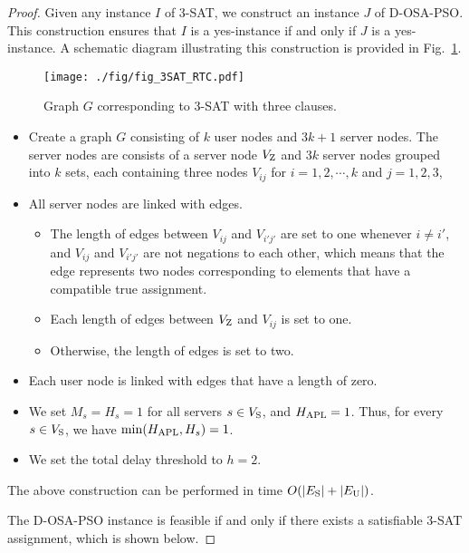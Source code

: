 \documentclass[conference]{IEEEtran}
\begin{document}
\begin{CJK}{UTF8}{ipxm}
\begin{proof}
  Given any instance $I$ of 3-SAT, we construct an instance $J$ of D-OSA-PSO. This construction ensures that $I$ is a yes-instance if and only if $J$ is a yes-instance. %
  A schematic diagram illustrating this construction is provided in Fig.~\ref{fig:3SAT_RTC}.
  \begin{figure}[!t]
    \begin{center}
      \texttt{[image: ./fig/fig\_3SAT\_RTC.pdf]}
    \end{center}
      \vspace{-0.3cm}
    \caption{Graph $G$ corresponding to 3-SAT with three clauses.}
    \label{fig:3SAT_RTC}
  \end{figure}

  \begin{itemize}
    \item Create a graph $G$ consisting of $k$ user nodes and $3k+1$ server nodes. The server nodes are consists of a server node $V_{\rm Z}$ and $3k$ server nodes grouped into $k$ sets, each containing three nodes $V_{ij}$ for $i = 1, 2, \cdots, k$ and $j = 1, 2, 3$, 
    \item All server nodes are linked with edges.
    \begin{itemize}
      \item The length of edges between $V_{ij}$ and $V_{i'j'}$ are set to one whenever $i \neq i'$, and $V_{ij}$ and $V_{i'j'}$ are not negations to each other, which means that the edge represents two nodes corresponding to elements that have a compatible true assignment.
      \item Each length of edges between $V_{\rm Z}$ and $V_{ij}$ is set to one.
      \item Otherwise, the length of edges is set to two.
    \end{itemize}
    \item Each user node is linked with edges that have a length of zero.
    \item We set $M_s = H_s = 1$ for all servers $s \in V_{\rm S}$, and $H_{\rm APL} = 1$. Thus, for every $s \in V_{\rm S}$, we have $\min(H_{\rm APL}, H_s) = 1$.
    \item We set the total delay threshold to $h = 2$.
  \end{itemize}
The above construction can be performed in time $O(|E_{\rm S}| + |E_{\rm U}|)$.


The D-OSA-PSO instance is feasible if and only if there exists a satisfiable 3-SAT assignment, which is shown below.


\end{proof}
\end{CJK}
\end{document}
